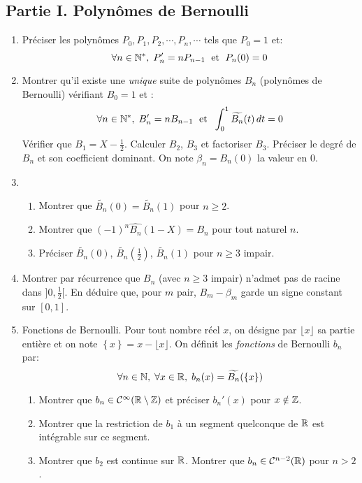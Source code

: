\subsection*{Partie I. Polynômes de Bernoulli}
\begin{enumerate}
  \item Préciser les polynômes $P_0, P_1, P_2, \cdots, P_n,\cdots$ tels que $ P_0 = 1$ et:
\begin{displaymath}
  \forall n\in \mathbb{N}^*, \;  P_n' = n P_{n-1} \;\text{ et }\; P_n(0) = 0
\end{displaymath}

 \item Montrer qu'il existe une \emph{unique} suite de polynômes $B_n$ (polynômes de Bernoulli) vérifiant $B_0=1$ et :
\begin{displaymath}
\forall n\in \mathbb{N}^*, \; B_{n}' = nB_{n-1}\; \text{ et }\; \int_0^1 \widetilde{B_{n}}(t)\,dt = 0
\end{displaymath}
Vérifier que $B_1 = X - \frac{1}{2}$. Calculer $B_2$, $B_3$ et factoriser $B_3$. Préciser le degré de $B_n$ et son coefficient dominant. On note $\beta_n = B_n(0)$ la valeur en $0$.
\item
\begin{enumerate}
 \item Montrer que $\widetilde{B_n}(0)=\widetilde{B_n}(1)$ pour $n\geq2$.
 \item Montrer que $(-1)^n\widehat{B_n}(1-X)= B_n$ pour tout naturel $n$.
 \item Préciser $\widetilde{B_n}(0)$, $\widetilde{B_n}(\frac{1}{2})$, $\widetilde{B_n}(1)$ pour $n\geq 3$ impair. 
\end{enumerate}
\item Montrer par récurrence que $B_{n}$ (avec $n \geq 3$ impair) n'admet pas de racine dans $]0,\frac{1}{2}[$.\newline
En déduire que, pour $m$ pair,  $B_m - \beta_{m}$ garde un signe constant sur $[0,1]$.

\item Fonctions de Bernoulli. Pour tout nombre réel $x$, on désigne par $\lfloor x\rfloor$ sa partie entière et on note $\left\lbrace x\right\rbrace = x - \lfloor x \rfloor$. On définit les \emph{fonctions} de Bernoulli $b_n$ par:
\begin{displaymath}
\forall n\in \mathbb{N},\;  \forall x \in \mathbb{R}, \; b_n(x) = \widetilde{B_n}(\{x\})
\end{displaymath}
\begin{enumerate}
  \item Montrer que $b_n\in \mathcal{C}^{\infty}(\mathbb{R}\setminus \mathbb{Z})$ et préciser $b_n'(x)$ pour $x\notin \mathbb{Z}$.
  \item Montrer que la restriction de $b_1$ à un segment quelconque de $\mathbb{R}$ est intégrable sur ce segment.
  \item Montrer que $b_2$ est continue sur $\mathbb{R}$. Montrer que $b_n\in \mathcal{C}^{n-2}(\mathbb{R})$ pour $n>2$.
\end{enumerate}
\end{enumerate}
 
